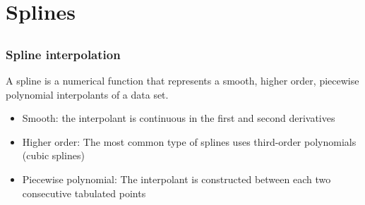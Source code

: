 \section{Splines}
\subsection*{}
\begin{frame}
  \frametitle{Spline interpolation}
  A spline is a numerical function that represents a {\color{tuealert}smooth}, {\color{tuealert}higher order}, {\color{tuealert}piecewise polynomial} interpolants of a data set.
  \pause
  \begin{itemize}
     \item Smooth: the interpolant is continuous in the first and second derivatives 
     \item Higher order: The most common type of splines uses third-order polynomials (cubic splines)
     \item Piecewise polynomial: The interpolant is constructed between each two consecutive tabulated points
  \end{itemize}
\end{frame}

